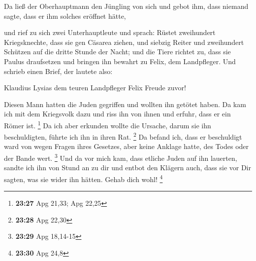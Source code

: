  Da ließ der Oberhauptmann den Jüngling von sich und gebot
ihm, dass niemand sagte, dass er ihm solches eröffnet hätte,

 und rief zu sich zwei Unterhauptleute und sprach: Rüstet
zweihundert Kriegsknechte, dass sie gen Cäsarea ziehen, und siebzig
Reiter und zweihundert Schützen auf die dritte Stunde der Nacht;
 und die Tiere richtet zu, dass sie Paulus draufsetzen und
bringen ihn bewahrt zu Felix, dem Landpfleger.  Und schrieb
einen Brief, der lautete also:

 Klaudius Lysias dem teuren Landpfleger Felix Freude zuvor!

 Diesen Mann hatten die Juden gegriffen und wollten ihn
getötet haben. Da kam ich mit dem Kriegsvolk dazu und riss ihn von ihnen
und erfuhr, dass er ein Römer ist. \footnote{\textbf{23:27} Apg 21,33;
  Apg 22,25}  Da ich aber erkunden wollte die Ursache,
darum sie ihn beschuldigten, führte ich ihn in ihren Rat. \footnote{\textbf{23:28}
  Apg 22,30}  Da befand ich, dass er beschuldigt ward von
wegen Fragen ihres Gesetzes, aber keine Anklage hatte, des Todes oder
der Bande wert. \footnote{\textbf{23:29} Apg 18,14-15}  Und
da vor mich kam, dass etliche Juden auf ihn lauerten, sandte ich ihn von
Stund an zu dir und entbot den Klägern auch, dass sie vor Dir sagten,
was sie wider ihn hätten. Gehab dich wohl! \footnote{\textbf{23:30} Apg
  24,8}

